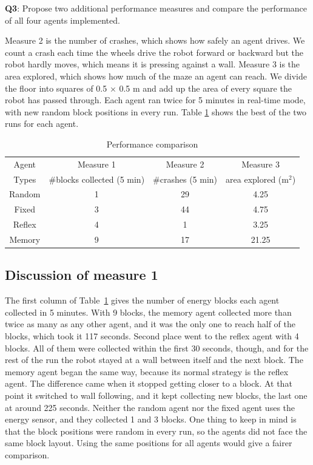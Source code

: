 \documentclass{article}
\begin{document}
\begin{tcolorbox}
\textbf{Q3}: Propose two additional performance measures and compare the performance of all four agents implemented. 
\end{tcolorbox}

Measure 2 is the number of crashes, which shows how safely an agent drives. We count a crash each time the wheels drive the robot forward or backward but the robot hardly moves, which means it is pressing against a wall. Measure 3 is the area explored, which shows how much of the maze an agent can reach. We divide the floor into squares of 0.5 × 0.5 m and add up the area of every square the robot has passed through. Each agent ran twice for 5 minutes in real-time mode, with new random block positions in every run. Table \ref{tab:comparison_robot} shows the best of the two runs for each agent.



\begin{table}[h]
\begin{center}
\begin{tabular}{cccc}
\toprule
    Agent & Measure 1 & Measure 2 & Measure 3 \\
    Types & \#blocks collected (5 min) & \#crashes (5 min) & area explored (m$^2$) \\\midrule
    Random & 1 & 29 & 4.25 \\
    Fixed  & 3 & 44 & 4.75 \\
    Reflex & 4 & 1  & 3.25 \\
    Memory & 9 & 17 & 21.25 \\
\bottomrule
\end{tabular}
\end{center}
\caption{Performance comparison}
\label{tab:comparison_robot}
\end{table}


\subsection*{Discussion of measure 1}

The first column of Table~\ref{tab:comparison_robot} gives the number of energy blocks each agent collected in 5 minutes. With 9 blocks, the memory agent collected more than twice as many as any other agent, and it was the only one to reach half of the blocks, which took it 117 seconds. Second place went to the reflex agent with 4 blocks. All of them were collected within the first 30 seconds, though, and for the rest of the run the robot stayed at a wall between itself and the next block. The memory agent began the same way, because its normal strategy is the reflex agent. The difference came when it stopped getting closer to a block. At that point it switched to wall following, and it kept collecting new blocks, the last one at around 225 seconds. Neither the random agent nor the fixed agent uses the energy sensor, and they collected 1 and 3 blocks. One thing to keep in mind is that the block positions were random in every run, so the agents did not face the same block layout. Using the same positions for all agents would give a fairer comparison.
\end{document}
